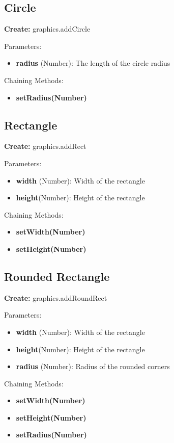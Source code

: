 \documentclass{article}
\begin{document}
\subsection{Circle}
\textbf{Create:} graphics.addCircle

Parameters:
\begin{itemize}
\item \textbf{radius} (Number): The length of the circle radius
\end{itemize}

Chaining Methods:
\begin{itemize}
\item \textbf{setRadius(Number)}
\end{itemize}

\subsection{Rectangle}
\textbf{Create:} graphics.addRect

Parameters:
\begin{itemize}
\item \textbf{width} (Number): Width of the rectangle
\item \textbf{height}(Number): Height of the rectangle
\end{itemize}

Chaining Methods:
\begin{itemize}
\item \textbf{setWidth(Number)} 
\item \textbf{setHeight(Number)}
\end{itemize}

\subsection{Rounded Rectangle}
\textbf{Create:} graphics.addRoundRect

Parameters:
\begin{itemize}
\item \textbf{width} (Number): Width of the rectangle
\item \textbf{height}(Number): Height of the rectangle
\item \textbf{radius} (Number): Radius of the rounded corners
\end{itemize}

Chaining Methods:
\begin{itemize}
\item \textbf{setWidth(Number)} 
\item \textbf{setHeight(Number)}
\item \textbf{setRadius(Number)}
\end{itemize}
\end{document}

